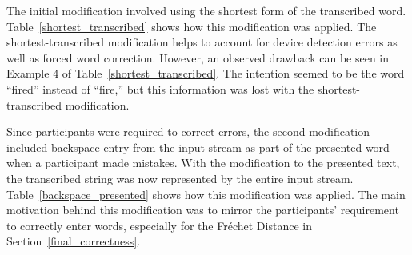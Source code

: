 The initial modification involved using the shortest form of the transcribed word. Table~\ref{shortest_transcribed} shows how this modification was applied. The shortest-transcribed modification helps to account for device detection errors as well as forced word correction. However, an observed drawback can be seen in Example 4 of Table~\ref{shortest_transcribed}. The intention seemed to be the word ``fired'' instead of ``fire,'' but this information was lost with the shortest-transcribed modification.

\begin{table}[!t] %
	\centering
	\caption[Shortest-transcribed Examples]{\centering Examples of the shortest-transcribed modification.}
	\label{shortest_transcribed}
\end{table}

Since participants were required to correct errors, the second modification included backspace entry from the input stream as part of the presented word when a participant made mistakes. With the modification to the presented text, the transcribed string was now represented by the entire input stream. Table~\ref{backspace_presented} shows how this modification was applied. The main motivation behind this modification was to mirror the participants' requirement to correctly enter words, especially for the Fr\'echet Distance in Section~\ref{final_correctness}.


